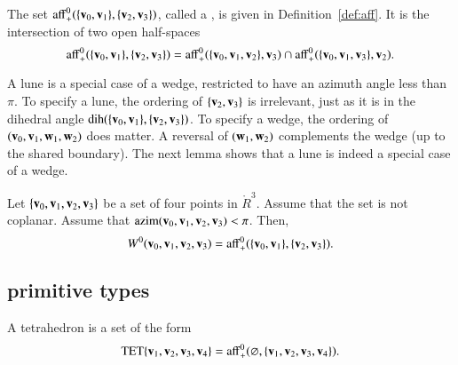 \begin{definition}[lune]\label{def:lune}
  The set ${\operatorname{aff}}^0_+(\{{\mathbf v}_0,{\mathbf v}_1\},\{{\mathbf v}_2,{\mathbf v}_3\})$, called a
  , is given in Definition~\ref{def:aff}.  It is the
  intersection of two open half-spaces
\[ 
{\operatorname{aff}}^0_+(\{{\mathbf v}_0,{\mathbf v}_1\},\{{\mathbf v}_2,{\mathbf v}_3\})
={\operatorname{aff}}^0_+(\{{\mathbf v}_0,{\mathbf v}_1,{\mathbf v}_2\},{\mathbf v}_3)\cap
{\operatorname{aff}}^0_+(\{{\mathbf v}_0,{\mathbf v}_1,{\mathbf v}_3\},{\mathbf v}_2).
\] 
\end{definition}

A lune is a special case of a wedge, restricted to have an azimuth
angle less than $\pi$.  To specify a lune, the ordering of
$\{{\mathbf v}_2,{\mathbf v}_3\}$ is irrelevant, just as it is in the dihedral angle
$\operatorname{dih}(\{{\mathbf v}_0,{\mathbf v}_1\},\{{\mathbf v}_2,{\mathbf v}_3\})$.  To specify a wedge, the ordering
of $({\mathbf v}_0,{\mathbf v}_1,{\mathbf w}_1,{\mathbf w}_2)$ does matter.  A reversal of $({\mathbf w}_1,{\mathbf w}_2)$
complements the wedge (up to the shared boundary).  The next lemma
shows that a lune is indeed a special case of a wedge.
%
%
%
%
%
%

\begin{lemma} 
  Let $\{{\mathbf v}_0,{\mathbf v}_1,{\mathbf v}_2,{\mathbf v}_3\}$ be a set of four points in
  $\ring{R}^3$.  Assume that the set is not coplanar.  Assume that
  ${\operatorname{azim}}({\mathbf v}_0,{\mathbf v}_1,{\mathbf v}_2,{\mathbf v}_3)<\pi$.  Then,
\[ W^0({\mathbf v}_0,{\mathbf v}_1,{\mathbf v}_2,{\mathbf v}_3) =
{\operatorname{aff}}^0_+(\{{\mathbf v}_0,{\mathbf v}_1\},\{{\mathbf v}_2,{\mathbf v}_3\}).\] 
%
\end{lemma}


\subsection{primitive types}

%

\begin{definition}[tetrahedron]
 A tetrahedron is a set of the form
\[ {\operatorname{TET}}\{{\mathbf v}_1,{\mathbf v}_2,{\mathbf v}_3,{\mathbf v}_4\} = 
{\operatorname{aff}}^0_+(\varnothing,\{{\mathbf v}_1,{\mathbf v}_2,{\mathbf v}_3,{\mathbf v}_4\}).\] 
%
\end{definition}
%


